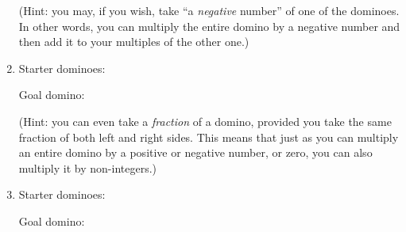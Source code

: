\begin{enumerate}
\footnotesize
(Hint: you may, if you wish, take ``a \textit{negative} number'' of one of the
dominoes. In other words, you can multiply the entire domino by a negative
number and then add it to your multiples of the other one.)
\normalsize

\item Starter dominoes:
\hspace{.3in}
\hspace{.1in}

Goal domino:
\hspace{1.1in}

\footnotesize
(Hint: you can even take a \textit{fraction} of a domino, provided you take the
same fraction of both left and right sides. This means that just as you can
multiply an entire domino by a positive or negative number, or zero, you can
also multiply it by non-integers.)
\normalsize

\pagebreak
\item Starter dominoes:
\hspace{.3in}
\hspace{.1in}

Goal domino:
\hspace{1.1in}


\end{enumerate}
